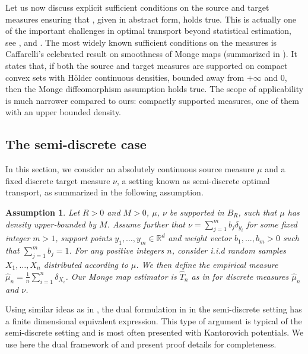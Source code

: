 \documentclass[11pt]{article}
\newtheorem{assumption}{Assumption}
\newcommand{\R}{\mathbb R}
\newcommand{\1}{\mathbbm{1}}
\numberwithin{equation}{section}
\begin{document}
Let us now discuss explicit sufficient conditions on the source and target measures ensuring that , given in abstract form, holds true. This is actually one of the important challenges in optimal transport beyond statistical estimation, see \cite[Remark 3]{hutter2021minimax}, \cite[Section 2]{manole2024plugin} and \cite[Section 12]{villani_opt_old_new}. The most widely known sufficient conditions on the measures is Caffarelli's celebrated result on smoothness of Monge maps \cite{caffarelli1992boundary,caffarelli1992regularity,caffarelli1996boundary} (summarized in \cite[Theorem 12.50]{villani_opt_old_new}). It states that, if both the source and target measures are supported on compact convex sets with H\"older continuous densities, bounded away from $+ \infty$ and $0$, then the Monge diffeomorphism assumption holds true. The scope of applicability is much narrower compared to ours: compactly supported measures, one of them with an upper bounded density.



\subsection{The semi-discrete case}\label{sec:semi-discr}
In this section, we consider an absolutely continuous source measure $\mu$ and a fixed discrete target measure $\nu$, a setting known as semi-discrete optimal transport, as summarized in the following assumption.
\begin{assumption}
    Let $R>0$ and $M>0$, $\mu$, $\nu$ be supported in $B_R$, such that $\mu$ has density upper-bounded by $M$. Assume further that $\nu=\sum_{j=1}^m b_j\delta_{y_i}$ for some fixed integer $m>1$, support points $y_1,\ldots,y_m\in \R^d$ and weight vector $b_1,\ldots, b_m > 0$ such that $\sum_{j=1}^m b_j = 1$. For any positive integers $n$, consider i.i.d random samples $X_1,\ldots,X_n$ distributed according to $\mu$. We then define the empirical measure $\hat{\mu}_n=\frac{1}{n}\sum_{i=1}^n\delta_{X_i}$. Our Monge map estimator is $\hat{T}_n$ as in  for discrete measures $\hat{\mu}_n$ and $\nu$.
    \label{assumption:semi_discrete}
\end{assumption}
Using similar ideas as in , the dual formulation in  in the semi-discrete setting has a finite dimensional equivalent expression. This type of argument is typical of the semi-discrete setting \cite{levy2024large} and is most often presented with Kantorovich potentials. We use here the dual framework of  and present proof details for completeness.
\end{document}
